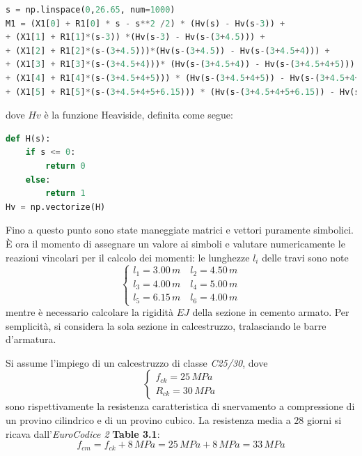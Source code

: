 \begin{lstlisting}[language=Python]
s = np.linspace(0,26.65, num=1000)
M1 = (X1[0] + R1[0] * s - s**2 /2) * (Hv(s) - Hv(s-3)) + 
+ (X1[1] + R1[1]*(s-3)) *(Hv(s-3) - Hv(s-(3+4.5))) + 
+ (X1[2] + R1[2]*(s-(3+4.5)))*(Hv(s-(3+4.5)) - Hv(s-(3+4.5+4))) + 
+ (X1[3] + R1[3]*(s-(3+4.5+4)))* (Hv(s-(3+4.5+4)) - Hv(s-(3+4.5+4+5))) + 
+ (X1[4] + R1[4]*(s-(3+4.5+4+5))) * (Hv(s-(3+4.5+4+5)) - Hv(s-(3+4.5+4+5+6.15))) + 
+ (X1[5] + R1[5]*(s-(3+4.5+4+5+6.15))) * (Hv(s-(3+4.5+4+5+6.15)) - Hv(s-(3+4.5+4+5+6.15+4)))
\end{lstlisting}
dove $Hv$ è la funzione Heaviside, definita come segue:

\begin{lstlisting}[language=Python]
def H(s):
    if s <= 0:
        return 0
    else:
        return 1
Hv = np.vectorize(H)
\end{lstlisting}

Fino a questo punto sono state maneggiate matrici e vettori puramente simbolici. È ora il momento di  assegnare un valore ai simboli e valutare numericamente le reazioni vincolari per il calcolo dei momenti: le lunghezze $l_i$ delle travi sono note
\begin{equation*}
 \begin{cases}
  l_1 = 3.00\,m \quad l_2 = 4.50\,m\\
  l_3 = 4.00\,m \quad l_4 = 5.00\,m\\
  l_5 = 6.15\,m \quad l_6 = 4.00\,m
 \end{cases}
\end{equation*}
mentre è necessario calcolare la rigidità $EJ$ della sezione in cemento armato. Per semplicità, si considera la sola sezione in calcestruzzo, tralasciando le barre d'armatura.

Si assume l'impiego di un calcestruzzo di classe \emph{C25/30}, dove
\begin{equation*}
 \begin{cases}
 	f_{ck} = 25\,MPa\\
 	R_{ck} = 30\,MPa
 \end{cases}
\end{equation*}
sono rispettivamente la resistenza caratteristica di snervamento a compressione di un provino cilindrico e di un provino cubico. La resistenza media a $28$ giorni si ricava dall'\emph{EuroCodice 2} \textbf{Table 3.1}:
\begin{equation*}
	f_{cm} = f_{ck} + 8\,MPa = 25\,MPa + 8\,MPa = 33\,MPa
\end{equation*}

